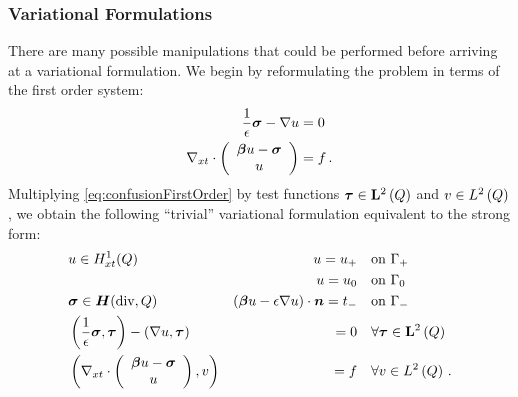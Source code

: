 \documentclass{article}
\begin{document}
\subsubsection{Variational Formulations}
There are many possible manipulations that could be performed before arriving at a variational formulation. 
We begin by reformulating the problem in terms of the first order system:
\begin{equation}
\label{eq:confusionFirstOrder}
\begin{aligned}
\frac{1}{\epsilon}\boldsymbol\sigma-\nabla u&=0\\
\nabla_{xt}\cdot\left( \begin{array}{c} \boldsymbol\beta u-\boldsymbol\sigma\\ u\\ \end{array} \right)&=f\,.
\end{aligned}
\end{equation}
Multiplying \eqref{eq:confusionFirstOrder} by test functions $\boldsymbol\tau\in\mathbf{L}^2\left( Q \right)$ and $v\in L^2\left( Q \right)$, we obtain the following 
``trivial'' variational formulation equivalent to the strong form:
\begin{equation}
\label{eq:confusionStrongBF}
	\begin{aligned}
		&u\in H^1_{xt}(Q) &u=u_+\quad &\text{on }\Gamma_+\\
		& &u=u_0\quad &\text{on }\Gamma_0\\
		&\boldsymbol\sigma\in \mbox{\boldmath $H$}(\text{div},Q)&(\boldsymbol\beta u-\epsilon\nabla u)\cdot\boldsymbol n=t_-\quad &\text{on }\Gamma_-\\
		&\left( \frac{1}{\epsilon}\boldsymbol\sigma,\boldsymbol\tau \right)-\left( \nabla u,\boldsymbol\tau \right)&=0\quad&\forall\boldsymbol\tau\in\mathbf{L}^2\left( Q \right)\\
		&\left( \nabla_{xt}\cdot\left( \begin{array}{c} \boldsymbol\beta u-\boldsymbol\sigma\\ u\\ \end{array} \right),v \right)&=f\quad&\forall v\in L^2\left( Q \right)\,.
	\end{aligned}
\end{equation}
\end{document}
